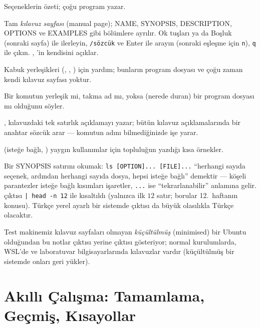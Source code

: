 \begin{description}[leftmargin=0pt,itemsep=0.25em]
  \item[\cmd{komut --help}] Seçeneklerin özeti; çoğu program yazar.
  \item[\cmd{man komut}] Tam \emph{kılavuz sayfası} (manual page); NAME, SYNOPSIS, DESCRIPTION, OPTIONS ve EXAMPLES gibi bölümlere ayrılır. Ok tuşları ya da Boşluk (sonraki sayfa) ile ilerleyin, \texttt{/sözcük} ve Enter ile arayın (sonraki eşleşme için \texttt{n}), \texttt{q} ile çıkın. , 'in kendisini açıklar.
  \item[\cmd{help komut}] Kabuk yerleşikleri (, , ) için yardım; bunların program dosyası ve çoğu zaman kendi kılavuz sayfası yoktur.
  \item[\cmd{type komut}] Bir komutun yerleşik mi, takma ad mı, yoksa (nerede duran) bir program dosyası mı olduğunu söyler.
  \item[\cmd{whatis} / \cmd{apropos}] , kılavuzdaki tek satırlık açıklamayı yazar;  bütün kılavuz açıklamalarında bir anahtar sözcük arar --- komutun adını bilmediğinizde işe yarar.
  \item[\cmd{tldr komut}] (isteğe bağlı, ) yaygın kullanımlar için topluluğun yazdığı kısa örnekler.
\end{description}


Bir SYNOPSIS satırını okumak: \texttt{ls [OPTION]... [FILE]...} ``herhangi sayıda seçenek, ardından herhangi sayıda dosya, hepsi isteğe bağlı'' demektir --- köşeli parantezler isteğe bağlı kısımları işaretler, \texttt{...} ise ``tekrarlanabilir'' anlamına gelir.  çıktısı \texttt{| head -n 12} ile kısaltıldı (yalnızca ilk $12$ satır; borular 12.\ haftanın konusu). Türkçe yerel ayarlı bir sistemde  çıktısı da büyük olasılıkla Türkçe olacaktır.

Test makinemiz kılavuz sayfaları olmayan \emph{küçültülmüş} (minimised) bir Ubuntu olduğundan bu notlar  çıktısı yerine  çıktısı gösteriyor; normal kurulumlarda, WSL'de ve laboratuvar bilgisayarlarında kılavuzlar vardır (küçültülmüş bir sistemde  onları geri yükler).

\section{Akıllı Çalışma: Tamamlama, Geçmiş, Kısayollar}

